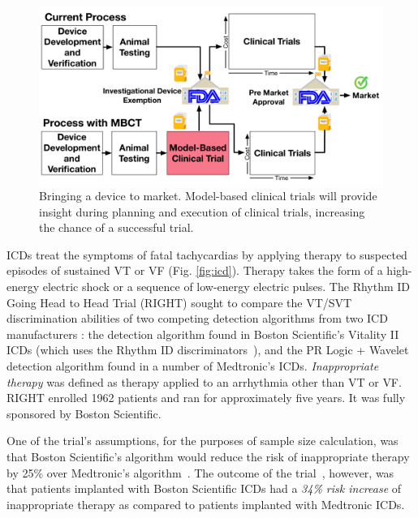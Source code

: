 	\begin{figure}[t]
		\centering
		\vspace{-10pt}
		\includegraphics[scale=0.25]{figures/figTransResearchSpectrum.pdf}
		\vspace{-10pt}
		\caption{\small Bringing a device to market.			
			Model-based clinical trials will provide insight during planning and execution of clinical trials, increasing the chance of a successful trial.}
		\vspace{-10pt}
		\label{fig:spectrum}
	\end{figure}

\acp{ICD} treat the symptoms of fatal tachycardias by applying therapy to suspected episodes of sustained \ac{VT} or \ac{VF} (Fig. \ref{fig:icd}).
Therapy takes the form of a high-energy electric shock or a sequence of low-energy electric pulses.
The Rhythm ID Going Head to Head Trial (RIGHT) \cite{GoldABBTB11_RIGHTresults} sought to compare the VT/SVT discrimination abilities of two competing detection algorithms from two ICD manufacturers \cite{GoldABBTB11_RIGHTresults}: 
the detection algorithm found in Boston Scientific's Vitality II ICDs (which uses the Rhythm ID discriminators~\cite{compass}),
and the PR Logic + Wavelet detection algorithm found in a number of Medtronic's ICDs.
\emph{Inappropriate therapy} was defined as therapy applied to an arrhythmia other than \ac{VT} or \ac{VF}.
RIGHT enrolled 1962 patients and ran for approximately five years.
It was fully sponsored by Boston Scientific. 

One of the trial's assumptions, for the purposes of sample size calculation, was that Boston Scientific's algorithm would reduce the risk of inappropriate therapy by 25\% over Medtronic's algorithm~\cite{Berger06_RIGHT}.
The outcome of the trial~\cite{GoldABBTB11_RIGHTresults}, however, was that patients implanted with Boston Scientific \acp{ICD} had a \emph{34\% risk increase} of inappropriate therapy as compared to patients implanted with Medtronic ICDs. 

